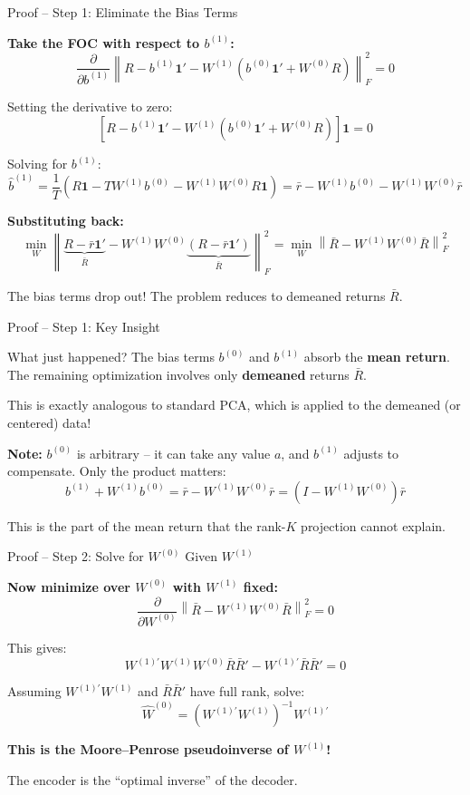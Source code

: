 \documentclass[aspectratio=169]{beamer}
\begin{document}
%
%
\begin{frame}{Proof -- Step 1: Eliminate the Bias Terms}

\textbf{Take the FOC with respect to $b^{(1)}$:}
\[
\frac{\partial}{\partial b^{(1)}} \left\| R - b^{(1)}\bm{1}' - W^{(1)}(b^{(0)}\bm{1}' + W^{(0)}R) \right\|_F^2 = 0
\]

Setting the derivative to zero:
\[
\left[R - b^{(1)}\bm{1}' - W^{(1)}(b^{(0)}\bm{1}' + W^{(0)}R)\right]\bm{1} = 0
\]

Solving for $b^{(1)}$:
\[
\hat{b}^{(1)} = \frac{1}{T}\left(R\bm{1} - TW^{(1)}b^{(0)} - W^{(1)}W^{(0)}R\bm{1}\right) = \bar{r} - W^{(1)}b^{(0)} - W^{(1)}W^{(0)}\bar{r}
\]

\textbf{Substituting back:}
\[
\min_{W} \left\| \underbrace{R - \bar{r}\bm{1}'}_{\bar{R}} - W^{(1)}W^{(0)}\underbrace{(R - \bar{r}\bm{1}')}_{\bar{R}} \right\|_F^2 = \min_{W} \left\| \bar{R} - W^{(1)}W^{(0)}\bar{R} \right\|_F^2
\]

The bias terms drop out! The problem reduces to demeaned returns $\bar{R}$.
\end{frame}
%
%
\begin{frame}{Proof -- Step 1: Key Insight}

\begin{exampleblock}{What just happened?}
The bias terms $b^{(0)}$ and $b^{(1)}$ absorb the \textbf{mean return}. The remaining optimization involves only \textbf{demeaned} returns $\bar{R}$.
\end{exampleblock}

\vspace{0.5em}
This is exactly analogous to standard PCA, which is applied to the demeaned (or centered) data!

\vspace{0.5em}
\textbf{Note:} $b^{(0)}$ is arbitrary -- it can take any value $a$, and $b^{(1)}$ adjusts to compensate. Only the product matters:
\[
b^{(1)} + W^{(1)}b^{(0)} = \bar{r} - W^{(1)}W^{(0)}\bar{r} = (I - W^{(1)}W^{(0)})\bar{r}
\]

This is the part of the mean return that the rank-$K$ projection cannot explain.
\end{frame}
%
%
\begin{frame}{Proof -- Step 2: Solve for $W^{(0)}$ Given $W^{(1)}$}

\textbf{Now minimize over $W^{(0)}$ with $W^{(1)}$ fixed:}
\[
\frac{\partial}{\partial W^{(0)}} \left\| \bar{R} - W^{(1)}W^{(0)}\bar{R} \right\|_F^2 = 0
\]

This gives:
\[
W^{(1)\prime}W^{(1)}W^{(0)}\bar{R}\bar{R}' - W^{(1)\prime}\bar{R}\bar{R}' = 0
\]

Assuming $W^{(1)\prime}W^{(1)}$ and $\bar{R}\bar{R}'$ have full rank, solve:
\[
\boxed{\hat{W}^{(0)} = \left(W^{(1)\prime}W^{(1)}\right)^{-1}W^{(1)\prime}}
\]

\vspace{0.5em}
\textbf{This is the Moore--Penrose pseudoinverse of $W^{(1)}$!}

The encoder is the ``optimal inverse'' of the decoder.
\end{frame}
\end{document}
